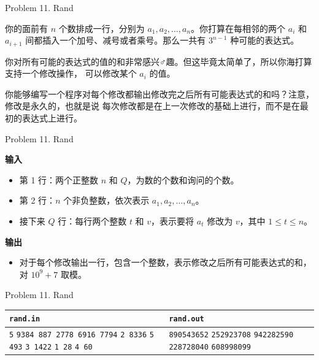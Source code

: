 \documentclass[UTF8]{beamer}
\begin{document}

\begin{frame}{Problem 11. Rand}

你的面前有 $n$ 个数排成一行，分别为 $a_1, a_2, \dots, a_n$。你打算在每相邻的两个
$a_i$ 和 $a_{i+1}$ 间都插入一个加号、减号或者乘号。那么一共有 $3^{n-1}$ 种可能的表达式。

你对所有可能的表达式的值的和非常感兴♂趣。但这毕竟太简单了，所以你海打算支持一个修改操作，
可以修改某个 $a_i$ 的值。

你能够编写一个程序对每个修改都输出修改完之后所有可能表达式的和吗？注意，修改是永久的，也就是说
每次修改都是在上一次修改的基础上进行，而不是在最初的表达式上进行。

\end{frame}

\begin{frame}{Problem 11. Rand}

\textbf{输入}
\begin{itemize}
    \item 第 1 行：两个正整数 $n$ 和 $Q$，为数的个数和询问的个数。
    \item 第 2 行：$n$ 个非负整数，依次表示 $a_1, a_2, \dots, a_n$。
    \item 接下来 $Q$ 行：每行两个整数 $t$ 和 $v$，表示要将 $a_t$ 修改为 $v$，其中 $1 \leq t \leq n$。
\end{itemize}
\textbf{输出}
\begin{itemize}
    \item 对于每个修改输出一行，包含一个整数，表示修改之后所有可能表达式的和，对 $10^9 + 7$ 取模。
\end{itemize}

\end{frame}

\begin{frame}{Problem 11. Rand}

\begin{tabularx}{\textwidth}{|X|X|}
\hline
\texttt{\textbf{rand.in}} & \texttt{\textbf{rand.out}} \\ \hline
\texttt{5}\newline
\texttt{9384 887 2778 6916 7794}\newline
\texttt{2 8336}\newline
\texttt{5 493}\newline
\texttt{3 1422}\newline
\texttt{1 28}\newline
\texttt{4 60}
&
\texttt{890543652}\newline
\texttt{252923708}\newline
\texttt{942282590}\newline
\texttt{228728040}\newline
\texttt{608998099}
\\ \hline
\end{tabularx}
\newline

\end{frame}
\end{document}
